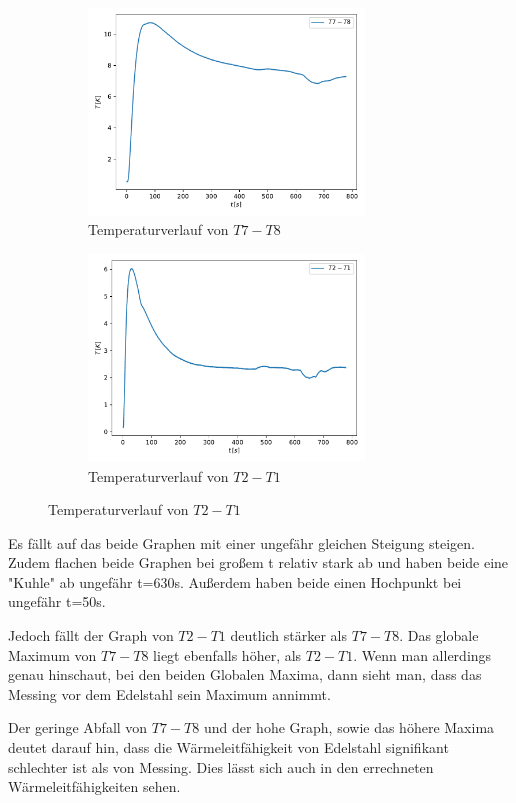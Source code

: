     \begin{figure}
        \begin{subfigure}{0.48\textwidth}
               \centering
               \includegraphics[height=5.5cm]{Daten/grafic1.pdf}
               \caption{Temperaturverlauf von $T7-T8$}
               \label{fig:static_T7-T8}
        \end{subfigure}
    \hfill
        \begin{subfigure}{0.48\textwidth}
               \centering
               \includegraphics[height=5.5cm]{Daten/grafic2.pdf}
               \caption{Temperaturverlauf von $T2-T1$}
               \label{fig:static_T2-T1}
        \end{subfigure}
    \end{figure}

    Es fällt auf das beide Graphen mit einer ungefähr gleichen Steigung steigen. Zudem flachen beide Graphen bei großem t relativ stark ab und haben beide eine "Kuhle" ab ungefähr t=630s.
    Außerdem haben beide einen Hochpunkt bei ungefähr t=50s. 

Jedoch fällt der Graph von $T2-T1$ deutlich stärker als $T7-T8$. Das globale Maximum von $T7-T8$ liegt ebenfalls höher, als $T2-T1$. Wenn man allerdings genau hinschaut, bei den beiden Globalen Maxima,
    dann sieht man, dass das Messing vor dem Edelstahl sein Maximum annimmt. 

    Der geringe Abfall von $T7-T8$ und der hohe Graph, sowie das höhere Maxima deutet darauf hin, dass die Wärmeleitfähigkeit von Edelstahl signifikant schlechter ist als von Messing. Dies lässt sich auch in den
    errechneten Wärmeleitfähigkeiten sehen.

